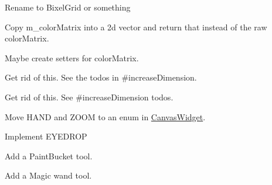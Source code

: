 
\begin{DoxyRefList}
\item[\label{todo__todo000010}%
\hypertarget{todo__todo000010}{}%
Class \hyperlink{classGLWidget}{G\-L\-Widget} ]Rename to Bixel\-Grid or something  
\item[\label{todo__todo000001}%
\hypertarget{todo__todo000001}{}%
Member \hyperlink{classGLWidget_aab1b8762be4b33d384e3689427c2addc}{G\-L\-Widget\-:\-:color\-Matrix} ()]Copy m\-\_\-color\-Matrix into a 2d vector and return that instead of the raw color\-Matrix. 

Maybe create setters for color\-Matrix.  
\item[\label{todo__todo000004}%
\hypertarget{todo__todo000004}{}%
Member \hyperlink{classGLWidget_a34c77d5e886569ec84123bb0da5a0751}{G\-L\-Widget\-:\-:decrease\-Dimension} ()]Get rid of this. See the todos in \#increase\-Dimension.  
\item[\label{todo__todo000002}%
\hypertarget{todo__todo000002}{}%
Member \hyperlink{classGLWidget_a0ecdf8ea93e62ab9d294714e59dafd64}{G\-L\-Widget\-:\-:dimension} ()]Get rid of this. See \#increase\-Dimension todos.  
\item[\label{todo__todo000011}%
\hypertarget{todo__todo000011}{}%
Member \hyperlink{classGLWidget_a9fba3eba78950865febd4547be0641d0}{G\-L\-Widget\-:\-:Draw\-Tool} ]Move H\-A\-N\-D and Z\-O\-O\-M to an enum in \hyperlink{classCanvasWidget}{Canvas\-Widget}. 

Implement E\-Y\-E\-D\-R\-O\-P 

Add a Paint\-Bucket tool. 

Add a Magic wand tool. 


\end{DoxyRefList}
